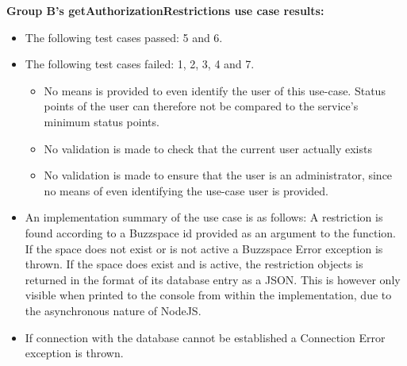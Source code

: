 \medskip

\noindent
\textbf{Group B's getAuthorizationRestrictions use case results:}\newline

\begin{itemize}
\item The following test cases passed:  5 and 6.
	
\item The following test cases failed: 1, 2, 3, 4 and 7.
	\begin{itemize}
		\item No means is provided to even identify the user of this use-case. Status points of the user can therefore not be compared to the service's minimum status points.
		\item No validation is made to check that the current user actually exists
		\item No validation is made to ensure that the user is an administrator, since no means of even identifying the use-case user is provided.
	\end{itemize}

	\item An implementation summary of the use case is as follows: A restriction is found according to a Buzzspace id provided as an argument to the function. If the space does not exist or is not active a Buzzspace Error exception is thrown. If the space does exist and is active, the restriction objects is returned in the format of its database entry as a JSON. This is however only visible when printed to the console from within the implementation, due to the asynchronous nature of NodeJS.

\item If connection with the database cannot be established a Connection Error exception is thrown.

\end{itemize}


